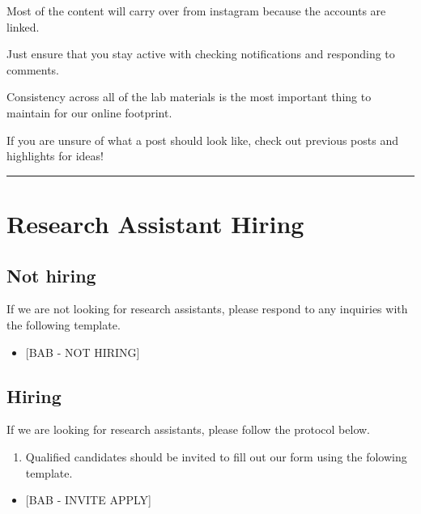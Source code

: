 \documentclass[]{book}
\providecommand{\tightlist}{%
  \setlength{\itemsep}{0pt}\setlength{\parskip}{0pt}}
\begin{document}
Most of the content will carry over from instagram because the accounts are linked.

Just ensure that you stay active with checking notifications and responding to comments.

Consistency across all of the lab materials is the most important thing to maintain for our online footprint.

If you are unsure of what a post should look like, check out previous posts and highlights for ideas!

\begin{center}\rule{0.5\linewidth}{0.5pt}\end{center}

\hypertarget{research-assistant-hiring}{%
\section{Research Assistant Hiring}\label{research-assistant-hiring}}

\hypertarget{not-hiring}{%
\subsection{Not hiring}\label{not-hiring}}

If we are not looking for research assistants, please respond to any inquiries with the following template.

\begin{itemize}
\tightlist
\item
  {[}BAB - NOT HIRING{]}
\end{itemize}

\hypertarget{hiring}{%
\subsection{Hiring}\label{hiring}}

If we are looking for research assistants, please follow the protocol below.

\begin{enumerate}
\def\labelenumi{\arabic{enumi}.}
\tightlist
\item
  Qualified candidates should be invited to fill out our form using the folowing template.
\end{enumerate}

\begin{itemize}
\tightlist
\item
  {[}BAB - INVITE APPLY{]}
\end{itemize}
\end{document}

